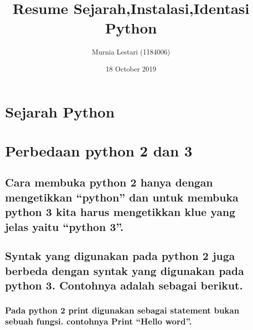 \documentclass{article}
\title{Resume Sejarah,Instalasi,Identasi Python}
\author{Murnia Lestari (1184006) }
\date{18 October 2019}
\begin{document}
\maketitle

\section { Sejarah Python}
\usepackage{Python merupakan bahasa pemrograman yang berpatokan dengan tingkat pembacaan kode yang cepat yang dikembangkan oleh Guido van Rossum di tahun 1990 yang terletak pada Mathematisch Centrum (CWI),sebagai  versi terbaru dari pemrograman ABC. Tahun 1995, saat itu Guido pidah lokasi ke CNRI di Virginia amerika dengan terus mengembangkan python . setelah itu pada tahun 2000 guido dan beberapa anggota tim pyton  ke Beopen.com. Saat ini perkembangan python masih terus berlanjut oleh bebrapa kumpulan pemrogram yang di koordinasikan Guido dan python software foundation. Nama python bersal dari kecintaan Guido pada sebuah acara televisi yang seringkali muncul dalam korespondensi antar bebrapa pengguna pada python.}

\section {Perbedaan python 2 dan 3}
\usepackage{Python versi  2 adalah bahasa pemrograman yang berpatokan dengan tingkat pembacaan kode yang cepat dan banyak digunakan oleh developer dan di lingkungan  produksi karena pada aplikasi python 2 dilegkapi dengan fitur programatikal. Sedangkan python 3 adalah bahasa pemrograman dengan tingkat pembacaan kode yang tinggi  sehingga python 3 memiliki banyak fitur yang lebih lengkap  karena python 3 merupakan pengembangan dari python 2.Contoh beberapa perbedaan pada python 2 dan 3 :}
\subsection{Cara membuka  python 2 hanya dengan mengetikkan “python” dan untuk membuka python 3 kita harus mengetikkan klue yang jelas yaitu “python 3”.}
\usepackage{}
 \subsection{ Syntak yang digunakan pada python 2 juga berbeda dengan syntak yang digunakan pada python 3. Contohnya adalah sebagai berikut.
}
 \subsubsection{Pada python 2 print digunakan sebagai statement bukan sebuah fungsi. contohnya Print “Hello word”.}
\end{document}
